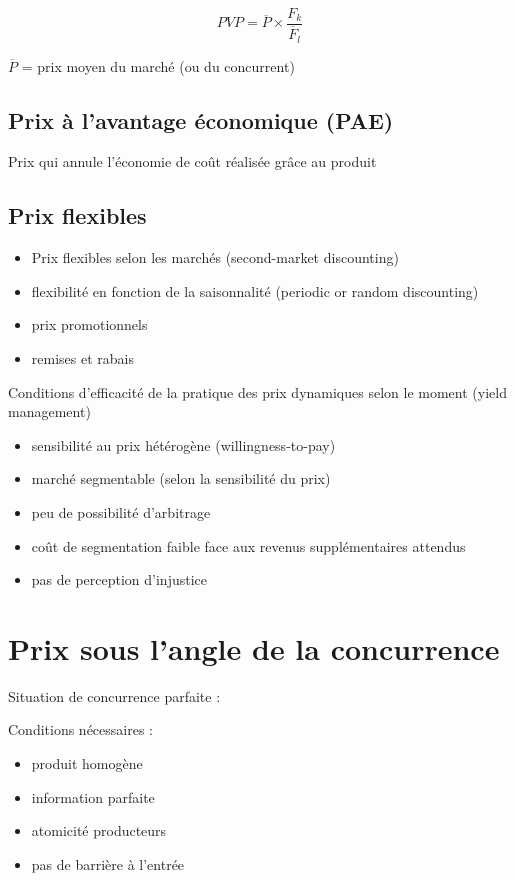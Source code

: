 		$$PVP = \overline{P} \times \frac{F_k}{\overline{F}_l}$$
		
		$\overline{P}$ = prix moyen du marché (ou du concurrent)
		
		
		\subsection{Prix à l'avantage économique (PAE)}
		
		Prix qui annule l'économie de coût réalisée grâce au produit
		
		
		\subsection{Prix flexibles}
		
		\begin{itemize}
			\item Prix flexibles selon les marchés (second-market discounting)
			\item flexibilité en fonction de la saisonnalité (periodic or random discounting)
			\item prix promotionnels
			\item remises et rabais
		\end{itemize}
		\n
		Conditions d'efficacité de la pratique des prix dynamiques selon le moment (yield management)
		
		\begin{itemize}
			\item sensibilité au prix hétérogène (willingness-to-pay)
			\item marché segmentable (selon la sensibilité du prix)
			\item peu de possibilité d'arbitrage
			\item coût de segmentation faible face aux revenus supplémentaires attendus
			\item pas de perception d'injustice
		\end{itemize}
		
		
	\section{Prix sous l'angle de la concurrence}
	
	
	Situation de concurrence parfaite :
	
	Conditions nécessaires :
	\begin{itemize}
		\item produit homogène
		\item information parfaite
		\item atomicité producteurs
		\item pas de barrière à l'entrée
	\end{itemize}
	
